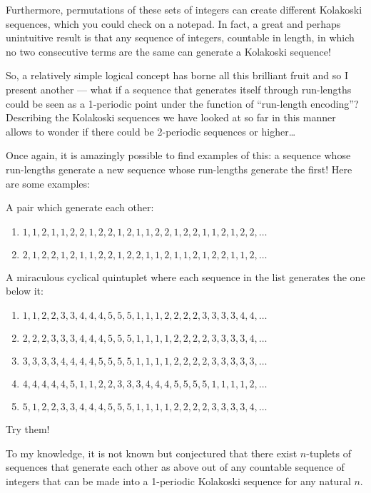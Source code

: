 \documentclass[titlepage,a4paper]{article}
\begin{document}
Furthermore, permutations of these sets of integers can create different Kolakoski sequences, which you could check on a notepad. In fact, a great and perhaps unintuitive result is that any sequence of integers, countable in length, in which no two consecutive terms are the same can generate a Kolakoski sequence! \par

So, a relatively simple logical concept has borne all this brilliant fruit and so I present another --- what if a sequence that generates itself through run-lengths could be seen as a 1-periodic point under the function of “run-length encoding”? Describing the Kolakoski sequences we have looked at so far in this manner allows to wonder if there could be 2-periodic sequences or higher…\par

Once again, it is amazingly possible to find examples of this: a sequence whose run-lengths generate a new sequence whose run-lengths generate the first! Here are some examples:\par

A pair which generate each other:\par
\begin{enumerate}
\item \(1, 1, 2, 1, 1, 2, 2, 1, 2, 2, 1, 2, 1, 1, 2, 2, 1, 2, 2, 1, 1, 2, 1, 2, 2, \ldots\)
\item \(2, 1, 2, 2, 1, 2, 1, 1, 2, 2, 1, 2, 2, 1, 1, 2, 1, 1, 2, 1, 2, 2, 1, 1, 2, \ldots\)
\end{enumerate}
A miraculous cyclical quintuplet where each sequence in the list generates the one below it:\par
\begin{enumerate}
\item \(1, 1, 2, 2, 3, 3, 4, 4, 4, 5, 5, 5, 1, 1, 1, 2, 2, 2, 2, 3, 3, 3, 3, 4, 4, \ldots\)
\item \(2, 2, 2, 3, 3, 3, 4, 4, 4, 5, 5, 5, 1, 1, 1, 1, 2, 2, 2, 2, 3, 3, 3, 3, 4, \ldots\)
\item \(3, 3, 3, 3, 4, 4, 4, 4, 5, 5, 5, 5, 1, 1, 1, 1, 2, 2, 2, 2, 3, 3, 3, 3, 3, \ldots\)
\item \(4, 4, 4, 4, 4, 5, 1, 1, 2, 2, 3, 3, 3, 4, 4, 4, 5, 5, 5, 5, 1, 1, 1, 1, 2, \ldots\)
\item \(5, 1, 2, 2, 3, 3, 4, 4, 4, 5, 5, 5, 1, 1, 1, 1, 2, 2, 2, 2, 3, 3, 3, 3, 4, \ldots\)
\end{enumerate}

Try them!\par
To my knowledge, it is not known but conjectured that there exist \(n\)-tuplets of sequences that generate each other as above out of any countable sequence of integers that can be made into a 1-periodic Kolakoski sequence for any natural \(n\).\par
\end{document}
